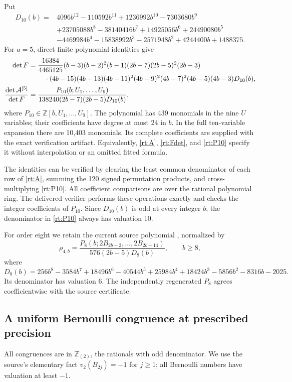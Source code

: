 \documentclass[11pt,a4paper]{article}
\numberwithin{equation}{section}
\theoremstyle{definition}
\theoremstyle{remark}
\begin{document}
Put
\begin{align*}
 D_{10}(b)={}&4096b^{12}-110592b^{11}+1236992b^{10}-7303680b^9\\
 &+23705088b^8-38140416b^7+14925056b^6+24490080b^5\\
 &-4469984b^4-15838992b^3-2571948b^2+4244400b+1488375.
\end{align*}
For $a=5$, direct finite polynomial identities give
\begin{align}\label{rt:Fdet}
 \det F={}&\frac{16384}{4465125}
 (b-3)(b-2)^2(b-1)(2b-7)(2b-5)^2(2b-3)\notag\\
 &\quad\cdot(4b-15)(4b-13)(4b-11)^2(4b-9)^2(4b-7)^2
 (4b-5)(4b-3)D_{10}(b),\\
 \frac{\det\mathcal A^{[5]}}{\det F}
 ={}&\frac{P_{10}(b;U_1,\ldots,U_9)}
 {138240(2b-7)(2b-5)D_{10}(b)},\label{rt:P10}
\end{align}
where $P_{10}\in\mathbb Z[b,U_1,\ldots,U_9]$. The polynomial has
439 monomials in the nine $U$ variables; their coefficients have
degree at most 24 in $b$. In the full ten-variable expansion there
are 10,403 monomials. Its complete coefficients are supplied with
the exact verification artifact. Equivalently,
\eqref{rt:A}, \eqref{rt:Fdet}, and \eqref{rt:P10} specify it without
interpolation or an omitted fitted formula.

The identities can be verified by clearing the least common denominator
of each row of \eqref{rt:A}, summing the 120 signed permutation
products, and cross-multiplying \eqref{rt:P10}. All coefficient
comparisons are over the rational polynomial ring. The delivered
verifier performs these operations exactly and checks the integer
coefficients of $P_{10}$. Since $D_{10}(b)$ is odd at every integer
$b$, the denominator in \eqref{rt:P10} always has valuation 10.

For order eight we retain the current source polynomial \cite{PRR}, normalized by
\[
 \rho_{4,b}=
 \frac{P_8(b;2B_{2b-2},\ldots,2B_{2b-14})}
 {576(2b-5)D_8(b)},\qquad b\ge8,
\]
where
\[
 D_8(b)=256b^8-3584b^7+18496b^6-40544b^5+25984b^4
       +18424b^3-5856b^2-8316b-2025.
\]
Its denominator has valuation 6. The independently regenerated
$P_8$ agrees coefficientwise with the source certificate.

\subsection{A uniform Bernoulli congruence at prescribed precision}

All congruences are in $\mathbb Z_{(2)}$, the rationals with odd
denominator. We use the source's elementary fact
$v_2(B_{2j})=-1$ for $j\ge1$; all Bernoulli numbers have valuation
at least $-1$.
\end{document}
